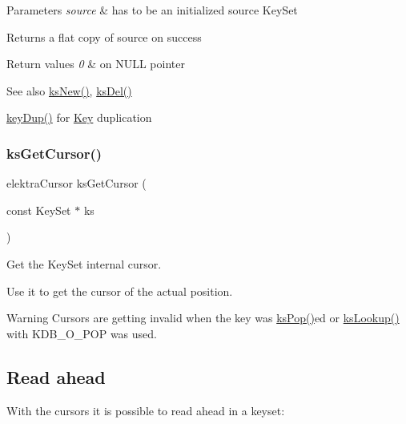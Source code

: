 \begin{DoxyParams}{Parameters}
{\em source} & has to be an initialized source Key\+Set \\
\hline
\end{DoxyParams}
\begin{DoxyReturn}{Returns}
a flat copy of source on success 
\end{DoxyReturn}

\begin{DoxyRetVals}{Return values}
{\em 0} & on N\+U\+LL pointer \\
\hline
\end{DoxyRetVals}
\begin{DoxySeeAlso}{See also}
\hyperlink{group__keyset_ga671e1aaee3ae9dc13b4834a4ddbd2c3c}{ks\+New()}, \hyperlink{group__keyset_ga27e5c16473b02a422238c8d970db7ac8}{ks\+Del()} 

\hyperlink{group__key_gae6ec6a60cc4b8c1463fa08623d056ce3}{key\+Dup()} for \hyperlink{group__key}{Key} duplication 
\end{DoxySeeAlso}
\mbox{\label{group__keyset_gace0444eb8ec958a429794f8586fc72e7}} 
\subsubsection{\texorpdfstring{ks\+Get\+Cursor()}{ksGetCursor()}}
{\footnotesize\ttfamily elektra\+Cursor ks\+Get\+Cursor (\begin{DoxyParamCaption}\item[{const Key\+Set $\ast$}]{ks }\end{DoxyParamCaption})}



Get the Key\+Set internal cursor. 

Use it to get the cursor of the actual position.

\begin{DoxyWarning}{Warning}
Cursors are getting invalid when the key was \hyperlink{group__keyset_gae42530b04defb772059de0600159cf69}{ks\+Pop()}ed or \hyperlink{group__keyset_ga60f1ddcf23272f2b29b90e92ebe9b56f}{ks\+Lookup()} with K\+D\+B\+\_\+\+O\+\_\+\+P\+OP was used.
\end{DoxyWarning}
\hypertarget{group__keyset_readahead}{}\subsection{Read ahead}\label{group__keyset_readahead}
With the cursors it is possible to read ahead in a keyset\+:


